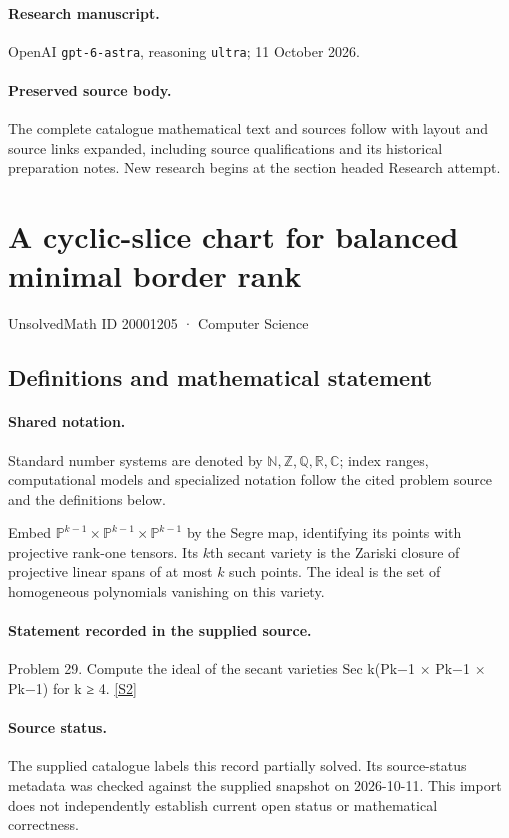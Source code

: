 \documentclass[11pt]{article}
\begin{document}
\paragraph{Research manuscript.} OpenAI \texttt{gpt-6-astra}, reasoning \texttt{ultra}; 11 October 2026.
\paragraph{Preserved source body.} The complete catalogue mathematical text and sources follow with layout and source links expanded, including source qualifications and its historical preparation notes. New research begins at the section headed Research attempt.

\section{A cyclic-slice chart for balanced minimal border rank}\label{20001205}
{\small UnsolvedMath ID 20001205 · Computer Science}
\subsection{Definitions and mathematical statement}

\paragraph{Shared notation.}Standard number systems are denoted by $\mathbb N,\mathbb Z,\mathbb Q,\mathbb R,\mathbb C$; index ranges, computational models and specialized notation follow the cited problem source and the definitions below.


Embed $\mathbb P^{k-1}\times\mathbb P^{k-1}\times\mathbb P^{k-1}$ by the Segre map, identifying its points with projective rank-one tensors. Its $k$th secant variety is the Zariski closure of projective linear spans of at most $k$ such points. The ideal is the set of homogeneous polynomials vanishing on this variety.
\paragraph{Statement recorded in the supplied source.}
Problem 29. Compute the ideal of the secant varieties Sec k(Pk−1 × Pk−1 × Pk−1) for k ≥ 4. \href{https://aimath.org/WWN/compalgstat/compalgstat.pdf}{[S2]}
\paragraph{Source status.}
The supplied catalogue labels this record partially solved. Its source-status metadata was checked against the supplied snapshot on 2026-10-11. This import does not independently establish current open status or mathematical correctness.
\end{document}
